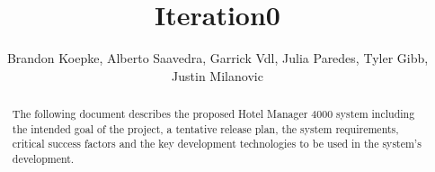 \begin{frontmatter}
	\title{Iteration0}
	\author{Brandon Koepke, Alberto Saavedra, Garrick Vdl, Julia Paredes, Tyler Gibb, Justin Milanovic}
	\begin{abstract}
		The following document describes the proposed Hotel Manager 4000 system including the intended goal of the project, a tentative release plan, the system requirements, critical success factors and the key development technologies to be used in the system's development.
	\end{abstract}
\end{frontmatter}
\tableofcontents
\clearpage
